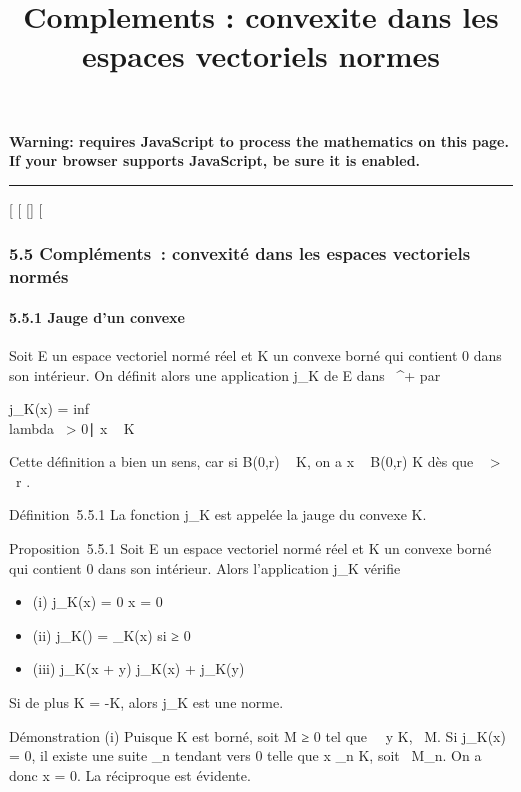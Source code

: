 \documentclass[]{article}
\title{Complements : convexite dans les espaces vectoriels normes}
\author{}
\date{}
\begin{document}
\maketitle

\textbf{Warning: 
requires JavaScript to process the mathematics on this page.\\ If your
browser supports JavaScript, be sure it is enabled.}

\begin{center}\rule{3in}{0.4pt}\end{center}

[
[
[]
[

\subsubsection{5.5 Compléments~: convexité dans les espaces vectoriels
normés}

\paragraph{5.5.1 Jauge d'un convexe}

Soit E un espace vectoriel normé réel et K un convexe borné qui contient
0 dans son intérieur. On définit alors une application j_K de E
dans ~^+ par

j_K(x) = inf~ \\lambda~
> 0∣ x \over
\lambda~ \in K\

Cette définition a bien un sens, car si B(0,r) \subset~ K, on a  x
\over \lambda~ \in B(0,r) \in K dès que \lambda~ >
\x\
\over r .

Définition~5.5.1 La fonction j_K est appelée la jauge du
convexe K.

Proposition~5.5.1 Soit E un espace vectoriel normé réel et K un convexe
borné qui contient 0 dans son intérieur. Alors l'application
j_K vérifie

\begin{itemize}
\itemsep1pt\parskip0pt
\item
  (i) j_K(x) = 0 \Leftrightarrow x = 0
\item
  (ii) j_K(\mux) = \muj_K(x) si \mu ≥ 0
\item
  (iii) j_K(x + y) \leq j_K(x) + j_K(y)
\end{itemize}

Si de plus K = -K, alors j_K est une norme.

Démonstration (i) Puisque K est borné, soit M ≥ 0 tel que
\forall~~y \in K,
\y\ \leq M. Si
j_K(x) = 0, il existe une suite \lambda_n tendant vers 0
telle que  x \over \lambda_n \in K, soit
\x\ \leq M\lambda_n.
On a donc x = 0. La réciproque est évidente.
\end{document}
